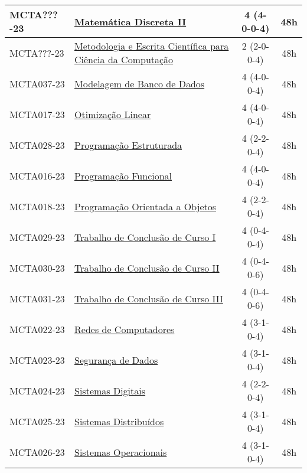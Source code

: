 \begin{table}[!h]
\begin{tabular}{|l|p{}|c|c|}
        \hline
        MCTA???-23 & \hyperref[disc:mdII]{Matemática Discreta II} & 4 (4-0-0-4) & 48h \\
        \hline
        MCTA???-23 & \hyperref[disc:metod]{Metodologia e Escrita Científica para Ciência da Computação} & 2 (2-0-0-4) & 48h \\
        \hline
        MCTA037-23 & \hyperref[disc:mbd]{Modelagem de Banco de Dados} & 4 (4-0-0-4) & 48h \\
        \hline
        MCTA017-23 & \hyperref[disc:ol]{Otimização Linear} & 4 (4-0-0-4) & 48h \\
        \hline
        MCTA028-23 & \hyperref[disc:pe]{Programação Estruturada} & 4 (2-2-0-4) & 48h \\
        \hline
        MCTA016-23 & \hyperref[disc:pf]{Programação Funcional} & 4 (4-0-0-4) & 48h \\
        \hline
        MCTA018-23 & \hyperref[disc:poo]{Programação Orientada a Objetos} & 4 (2-2-0-4) & 48h \\
        \hline
        MCTA029-23 & \hyperref[disc:tccI]{Trabalho de Conclusão de Curso I} & 4 (0-4-0-4) & 48h \\
        \hline
        MCTA030-23 & \hyperref[disc:tccII]{Trabalho de Conclusão de Curso II} & 4 (0-4-0-6) & 48h \\
        \hline
        MCTA031-23 & \hyperref[disc:tccIII]{Trabalho de Conclusão de Curso III} & 4 (0-4-0-6) & 48h \\
        \hline
        MCTA022-23 & \hyperref[disc:redes]{Redes de Computadores} & 4 (3-1-0-4) & 48h \\
        \hline
        MCTA023-23 & \hyperref[disc:seg]{Segurança de Dados} & 4 (3-1-0-4) & 48h \\
        \hline
        MCTA024-23 & \hyperref[disc:sist_dig]{Sistemas Digitais} & 4 (2-2-0-4) & 48h \\
        \hline
        MCTA025-23 & \hyperref[disc:sist_distr]{Sistemas Distribuídos} & 4 (3-1-0-4) & 48h \\
        \hline
        MCTA026-23 & \hyperref[disc:so]{Sistemas Operacionais} & 4 (3-1-0-4) & 48h\\
        \hline
    \end{tabular}
\end{table}


